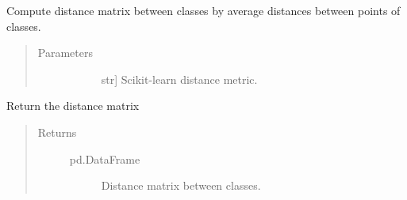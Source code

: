\documentclass[letterpaper,10pt,english]{sphinxmanual}
\begin{document}
\begin{fulllineitems}
\begin{fulllineitems}
\label{\detokenize{index:methylnet.interpretation_classes.DistanceMatrixCompute.compute_distances}}
Compute distance matrix between classes by average distances between points of classes.
\begin{quote}\begin{description}
\item[{Parameters}] \leavevmode\begin{description}
\item[{}] \leavevmode{[}str{]}
Scikit-learn distance metric.

\end{description}

\end{description}\end{quote}

\end{fulllineitems}


\begin{fulllineitems}
\label{\detokenize{index:methylnet.interpretation_classes.DistanceMatrixCompute.return_distances}}
Return the distance matrix
\begin{quote}\begin{description}
\item[{Returns}] \leavevmode\begin{description}
\item[{pd.DataFrame}] \leavevmode
Distance matrix between classes.

\end{description}

\end{description}\end{quote}

\end{fulllineitems}



\end{fulllineitems}
\end{document}
